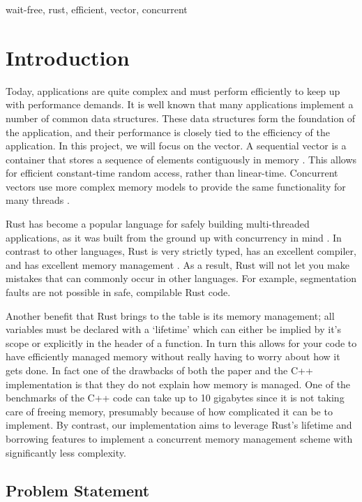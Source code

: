 \documentclass[conference]{IEEEtran}
\begin{document}
\begin{IEEEkeywords}
wait-free, rust, efficient, vector, concurrent
\end{IEEEkeywords}

\section{Introduction}

Today, applications are quite complex and must perform efficiently to keep up with performance demands. It is well known that many applications implement a number of common data structures. These data structures form the foundation of the application, and their performance is closely tied to the efficiency of the application. In this project, we will focus on the vector. A sequential vector is a container that stores a sequence of elements contiguously in memory \cite{main}. This allows for efficient constant-time random access, rather than linear-time. Concurrent vectors use more complex memory models to provide the same functionality for many threads \cite{main}.

Rust has become a popular language for safely building multi-threaded applications, as it was built from the ground up with concurrency in mind \cite{rust}. In contrast to other languages, Rust is very strictly typed, has an excellent compiler, and has excellent memory management \cite{rust}. As a result, Rust will not let you make mistakes that can commonly occur in other languages. For example, segmentation faults are not possible in safe, compilable Rust code.

Another benefit that Rust brings to the table is its memory management; all variables must be declared with a ‘lifetime’ which can either be implied by it’s scope or explicitly in the header of a function. In turn this allows for your code to have efficiently managed memory without really having to worry about how it gets done. In fact one of the drawbacks of both the paper and the C++ implementation is that they do not explain how memory is managed. One of the benchmarks of the C++ code can take up to 10 gigabytes since it is not taking care of freeing memory, presumably because of how complicated it can be to implement. By contrast, our implementation aims to leverage Rust's lifetime and borrowing features to implement a concurrent memory management scheme with significantly less complexity.



\subsection{Problem Statement}
\end{document}
